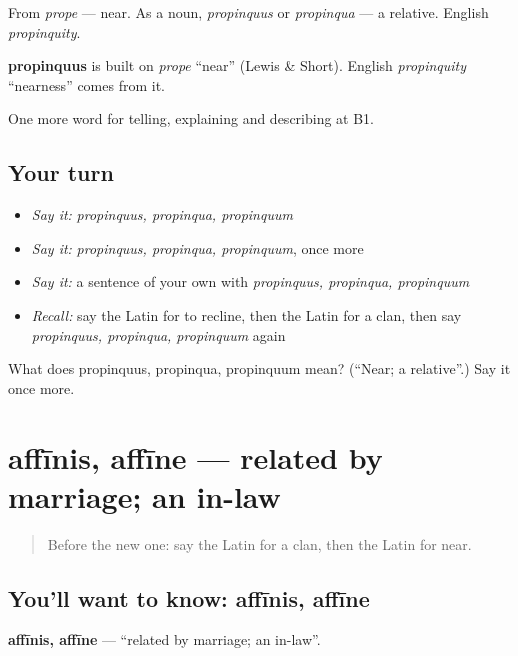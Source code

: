 From \emph{prope} — near. As a noun, \emph{propinquus} or \emph{propinqua} — a relative. English \emph{propinquity}.

\begin{cousinweb}
\textbf{propinquus} is built on \emph{prope} \textquotedblleft{}near\textquotedblright{} (Lewis \& Short). English \emph{propinquity} \textquotedblleft{}nearness\textquotedblright{} comes from it.
\end{cousinweb}

\begin{grammarlens}[title={What you've built}]
One more word for telling, explaining and describing at B1.
\end{grammarlens}

\subsection*{Your turn}
\begin{itemize}
\raggedright
  \item \emph{Say it:} \emph{propinquus, propinqua, propinquum}
  \item \emph{Say it:} \emph{propinquus, propinqua, propinquum}, once more
  \item \emph{Say it:} a sentence of your own with \emph{propinquus, propinqua, propinquum}
  \item \emph{Recall:} say the Latin for to recline, then the Latin for a clan, then say \emph{propinquus, propinqua, propinquum} again
\end{itemize}

\begin{tcolorbox}[breakable,colback=teal!4,colframe=teal!35!black,title={Before you move on}]
What does propinquus, propinqua, propinquum mean? (\textquotedblleft{}Near; a relative\textquotedblright{}.) Say it once more.
\end{tcolorbox}
\section[affīnis, affīne]{affīnis, affīne — related by marriage; an in-law}

\label{lesson:LA-C528-affinis}



\begin{quote}
Before the new one: say the Latin for a clan, then the Latin for near.
\end{quote}

\subsection*{You'll want to know: affīnis, affīne}
\textbf{affīnis, affīne} — \textquotedblleft{}related by marriage; an in-law\textquotedblright{}.

